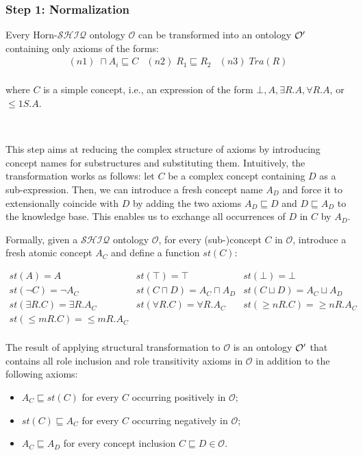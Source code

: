 \documentclass[oneside]{book}
\newcommand{\shiq}{$\mathcal{SHIQ}$\xspace}
\newcommand{\hshiq}{Horn-\shiq\xspace}
\newcommand{\Onto}{\mathcal{O}}
\newcommand{\dlisa}{\sqsubseteq}
\newcommand{\dland}{\sqcap}
\newcommand{\dlor}{\sqcup}
\begin{document}
\subsubsection{Step 1: Normalization}

Every \hshiq ontology $\Onto$ can be transformed into an ontology $\cal O'$ containing only axioms of the forms: 
%
\[
\begin{array}{lll}
(n1) \; \dland A_i \dlisa C & (n2) \; R_1 \dlisa R_2 & (n3) \; Tra(R) \\
\end{array}
\]

where $C$ is a simple concept, i.e., an expression of the form $\bot, A, \exists R.A, \forall R.A$, or $\leq1S.A$. 

\

This step aims at reducing the complex structure of axioms by introducing concept names for substructures and substituting them. 
Intuitively, the transformation works as follows:
let $C$ be a complex concept containing $D$ as a sub-expression. Then, we can introduce a fresh concept name $A_D$ and force it to extensionally coincide with $D$ by adding
the two axioms $A_D \dlisa D$ and $D \dlisa A_D$ to the knowledge base. This enables
us to exchange all occurrences of $D$ in $C$ by $A_D$.

Formally, given a \shiq ontology $\Onto$, for every (sub-)concept $C$ in $\Onto$, introduce a fresh atomic concept $A_C$ and define a function $st(C)$: 

\[
\begin{array}{lllll}
st(A) = A & 
st(\top) = \top &
st(\bot) = \bot \\
st(\neg C) = \neg A_C &
st(C \dland D) = A_C \dland A_D &
st(C \dlor D) = A_C \dlor A_D \\ 
st(\exists R.C) = \exists R.A_C &
st(\forall R.C) = \forall R.A_C & 
st(\geq nR.C) = \geq nR.A_C \\
st(\leq mR.C) = \leq mR.A_C \\
\end{array}
\]


The result of applying structural transformation to $\Onto$ is an ontology $\cal O'$ that contains all role inclusion and role transitivity axioms in $\Onto$ in addition to the following axioms:

\begin{itemize}
	\item $A_C \dlisa st(C)$ for every $C$ occurring positively in $\Onto$;
	
	\item $st(C) \dlisa A_C$ for every $C$ occurring negatively in $\Onto$;
	
	\item $A_C \dlisa A_D$ for every concept inclusion $C \dlisa D \in \Onto$.
\end{itemize} 
\end{document}

